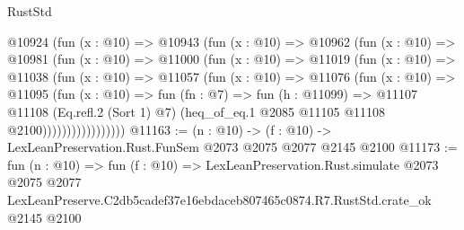 \begin{lexlean}{RustStd}
\begin{coremodule}
              @10924
                (fun (x : @10) =>
                @10943
                  (fun (x : @10) =>
                  @10962
                    (fun (x : @10) =>
                    @10981
                      (fun (x : @10) =>
                      @11000
                        (fun (x : @10) =>
                        @11019
                          (fun (x : @10) =>
                          @11038
                            (fun (x : @10) =>
                            @11057
                              (fun (x : @10) =>
                              @11076
                                (fun (x : @10) =>
                                @11095
                                  (fun (x : @10) =>
                                  fun (fn : @7) =>
                                  fun (h : @11099) =>
                                  @11107
                                    @11108
                                    (Eq.refl.{2} (Sort 1) @7)
                                    (heq_of_eq.{1} @2085 @11105 @11108 @2100)))))))))))))))))
@11163 := (n : @10) -> (f : @10) -> LexLeanPreservation.Rust.FunSem @2073 @2075 @2077 @2145 @2100
@11173 := fun (n : @10) =>
  fun (f : @10) =>
  LexLeanPreservation.Rust.simulate
    @2073
    @2075
    @2077
    LexLeanPreserve.C2db5cadef37e16ebdaceb807465c0874.R7.RustStd.crate_ok
    @2145
    @2100
\end{coremodule}
\end{lexlean}
